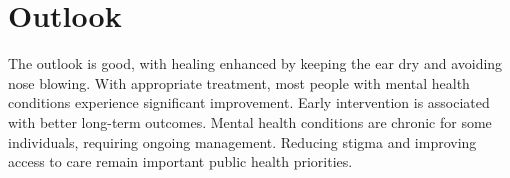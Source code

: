 \section{Outlook}
The outlook is good, with healing enhanced by keeping the ear dry and avoiding nose blowing. With appropriate treatment, most people with mental health conditions experience significant improvement. Early intervention is associated with better long-term outcomes. Mental health conditions are chronic for some individuals, requiring ongoing management. Reducing stigma and improving access to care remain important public health priorities.
